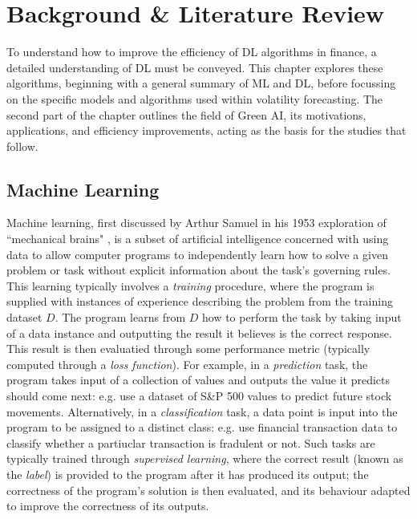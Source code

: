 \documentclass[a4paper, 11pt]{report}
\begin{document}
    \newpage
    \chapter{Background \& Literature Review}
    \label{chapter: literature}

    To understand how to improve the efficiency of DL algorithms in finance, a detailed understanding of DL must be conveyed. This chapter explores these algorithms, beginning with a general summary of ML and DL, before focussing on the specific models and algorithms used within volatility forecasting. The second part of the chapter outlines the field of Green AI, its motivations, applications, and efficiency improvements, acting as the basis for the studies that follow.


    \section{Machine Learning}

    Machine learning, first discussed by Arthur Samuel in his 1953 exploration of ``mechanical brains" \citep{samuel-1959}, is a subset of artificial intelligence concerned with using data to allow computer programs to independently learn how to solve a given problem or task without explicit information about the task's governing rules. This learning typically involves a \emph{training} procedure, where the program is supplied with instances of experience describing the problem from the training dataset $D$. The program learns from $D$ how to perform the  task by taking input of a data instance and outputting the result it believes is the correct response. This result is then evaluatied through some performance metric (typically computed through a \emph{loss function}). For example, in a \emph{prediction} task, the program takes input of a collection of values and outputs the value it predicts should come next: e.g. \citet{xiong-2015} use a dataset of S\&P 500 values to predict future stock movements. Alternatively, in a \emph{classification} task, a data point is input into the program to be assigned to a distinct class: e.g. \citet{sadgali-2019} use financial transaction data to classify whether a partiuclar transaction is fradulent or not. Such tasks are typically trained through \emph{supervised learning}, where the correct result (known as the \emph{label}) is provided to the program after it has produced its output; the correctness of the program's solution is then evaluated, and its behaviour adapted to improve the correctness of its outputs.
\end{document}
